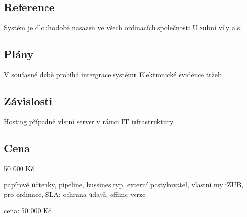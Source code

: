\documentclass[12pt, a4paper, titlepage]{article}
\begin{document}
	\subsection*{Reference}
	Systém je dlouhodobě nasazen ve všech ordinacích společnosti U zubní víly a.s.

	\subsection*{Plány}
	V současné době probíhá intergrace systému Elektronické evidence tržeb

	\subsection*{Závislosti}
	Hosting případně vlstní server v rámci IT infrastruktury

	\subsection*{Cena}
	50 000 Kč

	papírové účtenky, pipeline, bussines typ, externí postykovatel, vlastní my iZUB, pro ordinace,
	SLA:
		ochrana údajů, offline verze

	cena:
		50 000 Kč
\end{document}
